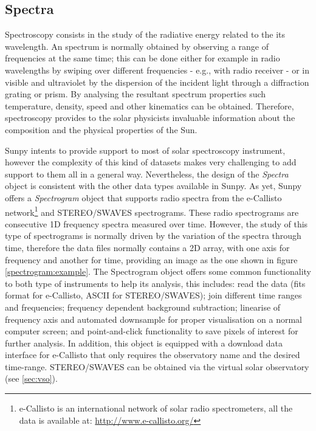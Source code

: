 \subsection{Spectra}\label{sec:spectra}

Spectroscopy consists in the study of the radiative energy related to the its wavelength.
An spectrum is normally obtained by observing a range of frequencies at the same time; 
this can be done either for example in radio wavelengths by swiping over different frequencies - e.g., with radio receiver - 
or in visible and ultraviolet by the dispersion of the incident light through a diffraction grating or prism.
By analysing the resultant spectrum properties such temperature, density, speed and other kinematics can be obtained. Therefore, spectroscopy provides to the solar physicists invaluable information about the composition and the physical properties of the Sun.  

Sunpy intents to provide support to most of solar spectroscopy instrument, however the complexity of this kind of datasets makes very challenging to add support to them all in a general way.  
Nevertheless, the design of the \textit{Spectra} object is consistent with the other data types available in Sunpy.
As yet, Sunpy offers a \textit{Spectrogram} object that supports radio spectra from the e-Callisto 
network\footnote{e-Callisto is an international network of solar radio spectrometers, all the data is available at: \url{http://www.e-callisto.org/} } 
and STEREO/SWAVES spectrograms.
These radio spectrograms are consecutive 1D frequency spectra measured over time.  
However, the study of this type of spectrograms is normally driven by the variation of the spectra through time, therefore the data files normally contains a 2D array, with one axis for frequency and another for time, providing an image as the one shown in figure \ref{spectrogram:example}.
The Spectrogram object offers some common functionality to both type of instruments to help its analysis, this includes:
read the data (fits format for e-Callisto, ASCII for STEREO/SWAVES); 
join different time ranges and frequencies; 
frequency dependent background subtraction;  
linearise of frequency axis and automated downsample for proper visualisation on a normal computer screen;  
and point-and-click functionality to save pixels of interest for further analysis.
In addition, this object is equipped with a download data interface for e-Callisto that only requires the observatory name and the desired time-range. STEREO/SWAVES can be obtained via the virtual solar observatory (see \s\ref{sec:vso}).




